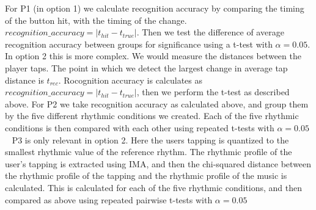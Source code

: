 For P1 (in option 1) we calculate recognition accuracy by comparing the timing of the button hit, with the timing of the change. $recognition\_accuracy = |t_{hit}-t_{true}|$. Then we test the difference of average recognition accuracy between groups for significance using a t-test with $\alpha=0.05$. In option 2 this is more complex. We would measure the distances between the player taps. The point in which we detect the largest change in average tap distance is $t_{rec}$. Rocognition accuracy is calculates as $recognition\_accuracy = |t_{hit}-t_{true}|$, then we perform the t-test as described above. 
For P2 we take recognition accuracy as calculated above, and group them by the five different rhythmic conditions we created. Each of the five rhythmic conditions is then compared with each other using repeated t-tests with $\alpha=0.05$\\  
P3 is only relevant in option 2. Here the users tapping is quantized to the smallest rhythmic value of the reference rhythm. The rhythmic profile of the user's tapping is extracted using IMA, and then the chi-squared distance between the rhythmic profile of the tapping and the rhythmic profile of the music is calculated. This is calculated for each of the five rhythmic conditions, and then compared as above using repeated pairwise t-tests with $\alpha=0.05$

